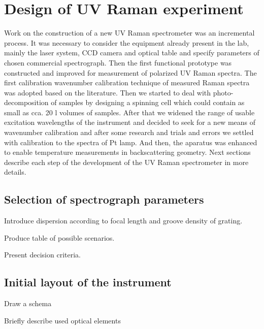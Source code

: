 \section{Design of UV Raman experiment}

Work on the construction of a new UV Raman spectrometer was an incremental
process. It was necessary to consider the equipment already present in the lab,
mainly the laser system, CCD camera and optical table and specify parameters of
chosen commercial spectrograph. Then the first functional prototype was
constructed and improved for measurement of polarized UV Raman spectra. The
first calibration wavenumber calibration technique of measured Raman spectra
was adopted based on the literature. Then we started to deal with
photo-decomposition of samples by designing a spinning cell which could contain
as small as cca. 20 l volumes of samples. After that we widened the range
of usable excitation wavelengths of the instrument and decided to seek for a
new means of wavenumber calibration and after some research and trials and
errors we settled with calibration to the spectra of Pt lamp. And then, the
aparatus was enhanced to enable temperature measurements in backscattering
geometry. Next sections describe each step of the development of the UV Raman
spectrometer in more details.


\subsection{Selection of spectrograph parameters}
\begin{docitemize}
	\item Introduce dispersion according to focal length and groove density of
	grating.
	\item Produce table of possible scenarios.
	\item Present decision criteria.
\end{docitemize}


\subsection{Initial layout of the instrument}
\begin{docitemize}
	\item Draw a schema
	\item Briefly describe used optical elements
\end{docitemize}





